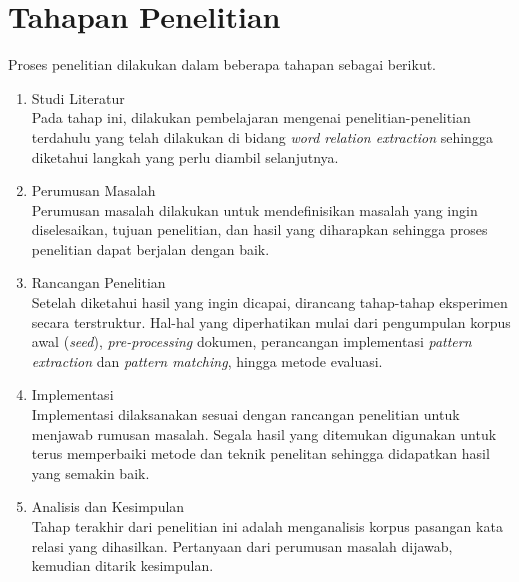 %
\section{Tahapan Penelitian}
Proses penelitian dilakukan dalam beberapa tahapan sebagai berikut.
\begin{enumerate}
	\item Studi Literatur \\
	Pada tahap ini, dilakukan pembelajaran mengenai penelitian-penelitian terdahulu yang telah dilakukan di bidang \textit{word relation extraction} sehingga diketahui langkah yang perlu diambil selanjutnya.
	\item Perumusan Masalah \\
	Perumusan masalah dilakukan untuk mendefinisikan masalah yang ingin diselesaikan, tujuan penelitian, dan hasil yang diharapkan sehingga proses penelitian dapat berjalan dengan baik.
	\item Rancangan Penelitian \\
	Setelah diketahui hasil yang ingin dicapai, dirancang tahap-tahap eksperimen secara terstruktur. Hal-hal yang diperhatikan mulai dari pengumpulan korpus awal (\textit{seed}), \textit{pre-processing} dokumen, perancangan implementasi \textit{pattern extraction} dan \textit{pattern matching}, hingga metode evaluasi.
	\item Implementasi \\
	Implementasi dilaksanakan sesuai dengan rancangan penelitian untuk menjawab rumusan masalah. Segala hasil yang ditemukan digunakan untuk terus memperbaiki metode dan teknik penelitan sehingga didapatkan hasil yang semakin baik.
	\item Analisis dan Kesimpulan \\
	Tahap terakhir dari penelitian ini adalah menganalisis korpus pasangan kata relasi yang dihasilkan. Pertanyaan dari perumusan masalah dijawab, kemudian ditarik kesimpulan.
\end{enumerate}

%
